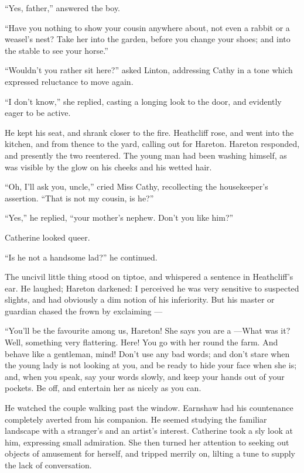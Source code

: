 \par “Yes, father,” answered the boy.
\par “Have you nothing to show your cousin anywhere about, not even a rabbit or a weasel's nest? Take her into the garden, before you change your shoes; and into the stable to see your horse.”
\par “Wouldn't you rather sit here?” asked Linton, addressing Cathy in a tone which expressed reluctance to move again.
\par “I don't know,” she replied, casting a longing look to the door, and evidently eager to be active.
\par He kept his seat, and shrank closer to the fire. Heathcliff rose, and went into the kitchen, and from thence to the yard, calling out for Hareton. Hareton responded, and presently the two reentered. The young man had been washing himself, as was visible by the glow on his cheeks and his wetted hair.
\par “Oh, I'll ask you, uncle,” cried Miss Cathy, recollecting the housekeeper's assertion. “That is not my cousin, is he?”
\par “Yes,” he replied, “your mother's nephew. Don't you like him?”
\par Catherine looked queer.
\par “Is he not a handsome lad?” he continued.
\par The uncivil little thing stood on tiptoe, and whispered a sentence in Heathcliff's ear. He laughed; Hareton darkened: I perceived he was very sensitive to suspected slights, and had obviously a dim notion of his inferiority. But his master or guardian chased the frown by exclaiming —
\par “You'll be the favourite among us, Hareton! She says you are a —What was it? Well, something very flattering. Here! You go with her round the farm. And behave like a gentleman, mind! Don't use any bad words; and don't stare when the young lady is not looking at you, and be ready to hide your face when she is; and, when you speak, say your words slowly, and keep your hands out of your pockets. Be off, and entertain her as nicely as you can.
\par He watched the couple walking past the window. Earnshaw had his countenance completely averted from his companion. He seemed studying the familiar landscape with a stranger's and an artist's interest. Catherine took a sly look at him, expressing small admiration. She then turned her attention to seeking out objects of amusement for herself, and tripped merrily on, lilting a tune to supply the lack of conversation.
